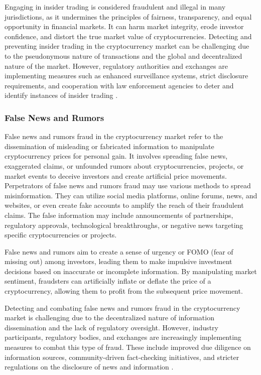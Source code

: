 Engaging in insider trading is considered fraudulent and illegal in many jurisdictions, as it undermines the principles
of fairness, transparency, and equal opportunity in financial markets. It can harm market integrity, erode investor confidence,
and distort the true market value of cryptocurrencies. Detecting and preventing insider trading in the cryptocurrency market
can be challenging due to the pseudonymous nature of transactions and the global and decentralized nature of the market.
However, regulatory authorities and exchanges are implementing measures such as enhanced surveillance systems, strict
disclosure requirements, and cooperation with law enforcement agencies to deter and identify instances of insider trading
\cite{chai2019insider, liu2020detecting}.

\subsubsection{False News and Rumors}
False news and rumors fraud in the cryptocurrency market refer to the dissemination of misleading or fabricated information
to manipulate cryptocurrency prices for personal gain. It involves spreading false news, exaggerated claims, or unfounded
rumors about cryptocurrencies, projects, or market events to deceive investors and create artificial price movements.
Perpetrators of false news and rumors fraud may use various methods to spread misinformation. They can utilize social media
platforms, online forums, news, and websites, or even create fake accounts to amplify the reach of their fraudulent claims.
The false information may include announcements of partnerships, regulatory approvals, technological breakthroughs, or
negative news targeting specific cryptocurrencies or projects.

False news and rumors aim to create a sense of urgency or FOMO (fear of missing out) among investors, leading them to make
impulsive investment decisions based on inaccurate or incomplete information. By manipulating market sentiment, fraudsters
can artificially inflate or deflate the price of a cryptocurrency, allowing them to profit from the subsequent price movement.

Detecting and combating false news and rumors fraud in the cryptocurrency market is challenging due to the decentralized
nature of information dissemination and the lack of regulatory oversight. However, industry participants, regulatory bodies,
and exchanges are increasingly implementing measures to combat this type of fraud. These include improved due diligence
on information sources, community-driven fact-checking initiatives, and stricter regulations on the disclosure of news 
and information \cite{yang2021spreading, feng2020cryptocurrency}.